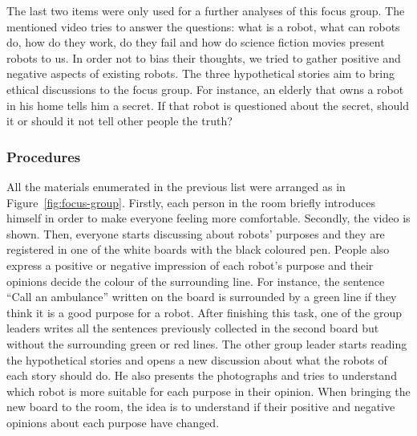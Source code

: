 The last two items were only used for a further analyses of this focus group.
The mentioned video tries to answer the questions: what is a robot, what can robots do, how do they work, do they fail and how do science fiction movies present robots to us.
In order not to bias their thoughts, we tried to gather positive and negative aspects of existing robots.
The three hypothetical stories aim to bring ethical discussions to the focus group.
For instance, an elderly that owns a robot in his home tells him a secret.
If that robot is questioned about the secret, should it or should it not tell other people the truth?

\subsubsection{Procedures}
All the materials enumerated in the previous list were arranged as in Figure~\ref{fig:focus-group}.
Firstly, each person in the room briefly introduces himself in order to make everyone feeling more comfortable.
Secondly, the video is shown.
Then, everyone starts discussing about robots' purposes and they are registered in one of the white boards with the black coloured pen.
People also express a positive or negative impression of each robot's purpose and their opinions decide the colour of the surrounding line.
For instance, the sentence ``Call an ambulance'' written on the board is surrounded by a green line if they think it is a good purpose for a robot.
After finishing this task, one of the group leaders writes all the sentences previously collected in the second board but without the surrounding green or red lines.
The other group leader starts reading the hypothetical stories and opens a new discussion about what the robots of each story should do.
He also presents the photographs and tries to understand which robot is more suitable for each purpose in their opinion.
When bringing the new board to the room, the idea is to understand if their positive and negative opinions about each purpose have changed.

